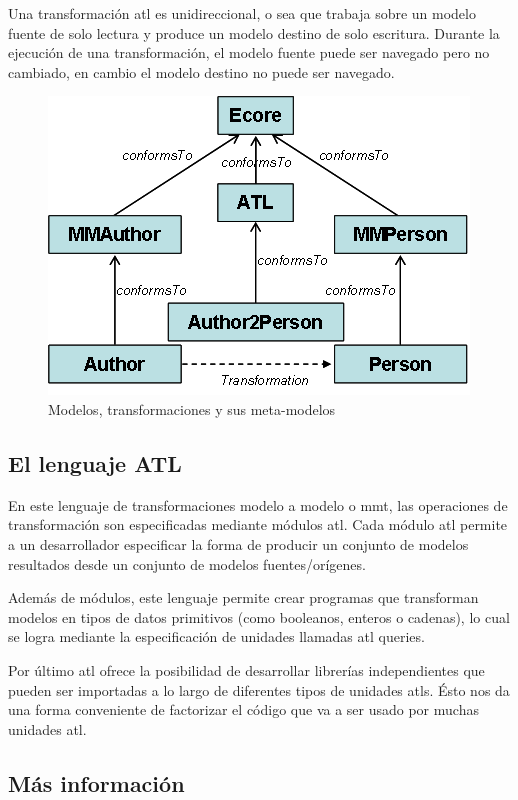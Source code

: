 \documentclass[a4paper,12pt,oneside,spanish]{book}
\begin{document}
Una transformación \gls{atl} es unidireccional, o sea que trabaja sobre un modelo fuente de solo lectura y produce un modelo destino de solo escritura. Durante la ejecución de una transformación, el modelo fuente puede ser navegado pero no cambiado, en cambio el modelo destino no puede ser navegado.

\begin{figure}[hbtp]
\centering
\includegraphics[scale=.65]{./img/ATL-concepts}
\caption{Modelos, transformaciones y sus meta-modelos}
\label{ATL-concepts}
\end{figure}


\subsection{El lenguaje ATL}

En este lenguaje de transformaciones modelo a modelo o \gls{mmt}, las operaciones de transformación son especificadas mediante módulos \gls{atl}. Cada módulo \gls{atl} permite a un desarrollador especificar la forma de producir un conjunto de modelos resultados desde un conjunto de modelos fuentes/orígenes. 

Además de módulos, este lenguaje permite crear programas que transforman modelos en tipos de datos primitivos (como booleanos, enteros o cadenas), lo cual se logra mediante la especificación de unidades llamadas \gls{atl} queries.

Por último \gls{atl} ofrece la posibilidad de desarrollar librerías independientes que pueden ser importadas a lo largo de diferentes tipos de unidades \glspl{atl}. Ésto nos da una forma conveniente de factorizar el código que va a ser usado por muchas unidades \gls{atl}.


\subsection{Más información}
\end{document}
